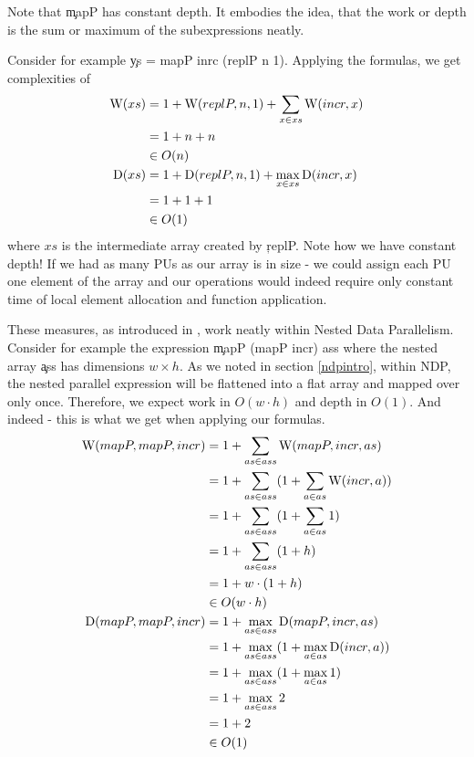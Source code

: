   Note that \c{mapP} has constant depth. 
  It embodies the idea, that the work or depth is the sum or maximum
  of the subexpressions neatly.
  
  Consider for example \c{ys = mapP inrc (replP n 1)}.
  Applying the formulas, we
  get complexities of
  \begin{equation}
  \begin{split}
  \textrm{W}(xs)
        & = 1 + \textrm{W}(replP,n,1) + \sum_{x \in xs}\textrm{W}(incr,x) \\
        & = 1 + n + n \\
        & \in O(n) \\
  \textrm{D}(xs) & = 1 + \textrm{D}(replP,n,1) + \max_{x \in xs}\textrm{D}(incr,x) \\
      & = 1 + 1 + 1 \\
      & \in O(1) \\
  \end{split}
  \end{equation}
  where $xs$ is the intermediate array created by \c{replP}.
  Note how we have constant depth!
  If we had as many PUs as our array is in size
  - we could assign each PU one element of the array and our operations
  would indeed require only constant time of local element allocation
  and function application.
  
  These measures, as introduced in \cite{Belloch1996}, work
  neatly within Nested Data Parallelism. Consider for example the
  expression \c{mapP (mapP incr) ass} where the
  nested array \c{ass} has dimensions $w \times h$.
  As we noted in section \ref{ndpintro}, within NDP,
  the nested parallel expression will be flattened into a
  flat array and mapped over only once. Therefore, we expect
  work in $O(w \cdot h)$ and depth in $O(1)$. And indeed - 
  this is what we get when applying our formulas.
  \begin{equation}
  \begin{split}
  \textrm{W}(mapP,mapP,incr)
        & = 1 + \sum_{as \in ass}\textrm{W}(mapP,incr,as) \\
        & = 1 + \sum_{as \in ass}(1 + \sum_{a \in as} \textrm{W}(incr,a)) \\
        & = 1 + \sum_{as \in ass}(1 + \sum_{a \in as} 1) \\
        & = 1 + \sum_{as \in ass}(1 + h) \\
        & = 1 + w \cdot (1 + h) \\
        & \in O(w \cdot h) \\
  \textrm{D}(mapP,mapP,incr) & = 1 + \max_{as \in ass}\textrm{D}(mapP,incr,as) \\
        & = 1 + \max_{as \in ass}(1 + \max_{a \in as} \textrm{D}(incr,a)) \\
        & = 1 + \max_{as \in ass}(1 + \max_{a \in as} 1) \\
        & = 1 + \max_{as \in ass}2 \\
        & = 1 + 2 \\
        & \in O(1) \\
  \end{split}
  \end{equation}
  
